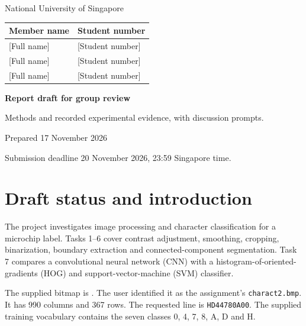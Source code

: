 \documentclass[11pt,a4paper]{article}
\newcommand{\topic}[1]{\clearpage\section{#1}}
\begin{document}
\hypersetup{pageanchor=false}
\begin{titlepage}\centering
\vspace*{18mm}
{\Large National University of Singapore\par}
\vspace{8mm}{\Large ME5411 Robot Vision and AI\par}
\vspace{16mm}{\LARGE Character Recognition on a Microchip\par}
\vspace{6mm}{\large Image Processing, CNN and HOG--SVM\par}
\vspace{14mm}{\Large Group 33\par}
\vspace{8mm}
\begin{tabular}{ll}\toprule Member name & Student number\\\midrule
{[Full name]} & {[Student number]}\\
{[Full name]} & {[Student number]}\\
{[Full name]} & {[Student number]}\\\bottomrule\end{tabular}
\vfill
\textbf{Report draft for group review}\par
Methods and recorded experimental evidence, with discussion prompts.\par
Prepared 17 November 2026\par
Submission deadline 20 November 2026, 23:59 Singapore time.
\end{titlepage}
\hypersetup{pageanchor=true}
\begingroup
\setlength{\parskip}{0pt}
\makeatletter
\renewcommand{\l@section}{\@dottedtocline{1}{0em}{2.5em}}
\makeatother
\tableofcontents
\endgroup
\topic{Draft status and introduction}
The project investigates image processing and character classification for a microchip label. Tasks 1--6 cover contrast adjustment, smoothing, cropping, binarization, boundary extraction and connected-component segmentation. Task 7 compares a convolutional neural network (CNN) with a histogram-of-oriented-gradients (HOG) and support-vector-machine (SVM) classifier.

The supplied bitmap is . The user identified it as the assignment's \texttt{charact2.bmp}. It has 990 columns and 367 rows. The requested line is \texttt{HD44780A00}. The supplied training vocabulary contains the seven classes 0, 4, 7, 8, A, D and H.
\end{document}
